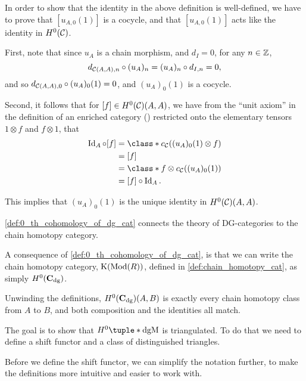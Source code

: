\begin{remark}
    In order to show that the identity in the above definition is well-defined, we have to prove that \( [u_{A, 0} (1)] \) is a cocycle, and that \( [u_{A, 0} (1)] \) acts like the identity in \( H^0({\mathcal{C}}) \).

    First, note that since \( u_A \) is a chain morphism, and \( d_I = 0 \), for any \( n \in {\mathbb{Z}} \),
    \[
        d_{{\mathcal{C}}(A, A), n} \circ (u_A)_n = (u_A)_n \circ d_{I, n} = 0,
    \]
    and so \( d_{{\mathcal{C}}(A, A), 0} \circ (u_A)_0 (1) = 0 \), and \( (u_A)_0 (1) \) is a cocycle.

    Second, it follows that for \( [f] \in H^0({\mathcal{C}})(A, A) \), we have from the ``unit axiom'' in the definition of an enriched category (\cite[Diagram 6.10]{Borceux_1994}) restricted onto the elementary tensors \( 1 \otimes f \) and \( f \otimes 1 \), that
    \begin{align*}
        \Id_A \circ [f] &= \class*{ c_{\Cc}((u_A)_0 (1) \otimes f) } \\
        &= [f] \\
        &= \class*{ f \otimes c_{\Cc}((u_A)_0 (1)) } \\
        &= [f] \circ \Id_A.
    \end{align*}

    This implies that \( (u_A)_0 (1) \) is the unique identity in \( H^0({\mathcal{C}})(A, A) \).
\end{remark}

\autoref{def:0_th_cohomology_of_dg_cat} connects the theory of DG-categories to the chain homotopy category.

\begin{remark}
    \label{rem:c_dg_h_0_is_chain_homotopy_cat}
    A consequence of \autoref{def:0_th_cohomology_of_dg_cat}, is that we can write the chain homotopy category, \( \operatorname{K}(\operatorname{Mod}(R)) \), defined in \autoref{def:chain_homotopy_cat}, as simply \( H^0(\operatorname{\mathbf{C}}_{\operatorname{dg}}) \).
    
    Unwinding the definitions, \( H^0(\operatorname{\mathbf{C}}_{\operatorname{dg}})(A, B) \) is exactly every chain homotopy class from \( A \) to \( B \), and both composition and the identities all match.
\end{remark}

The goal is to show that \( H^0\tuple*{\dgM} \) is triangulated. To do that we need to define a shift functor and a class of distinguished triangles.

Before we define the shift functor, we can simplify the notation further, to make the definitions more intuitive and easier to work with.

